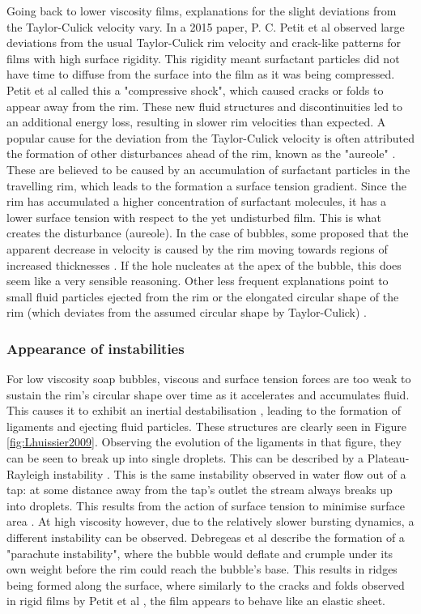 \documentclass[a4paper,12pt]{article}
\numberwithin{equation}{section}
\numberwithin{figure}{section}
\numberwithin{table}{section}
\begin{document}
Going back to lower viscosity films, explanations for the slight deviations from the Taylor-Culick velocity vary. In a 2015 paper, P. C. Petit et al \cite{Petit2015} observed large deviations from the usual Taylor-Culick rim velocity and crack-like patterns for films with high surface rigidity. This rigidity meant surfactant particles did not have time to diffuse from the surface into the film as it was being compressed. Petit et al called this a "compressive shock", which caused cracks or folds to appear away from the rim. These new fluid structures and discontinuities led to an additional energy loss, resulting in slower rim velocities than expected. A popular cause for the deviation from the Taylor-Culick velocity is often attributed the formation of other disturbances ahead of the rim, known as the "aureole" \cite{McEntee1969, Bico2015, Muller2009}. These are believed to be caused by an accumulation of surfactant particles in the travelling rim, which leads to the formation a surface tension gradient. Since the rim has accumulated a higher concentration of surfactant molecules, it has a lower surface tension with respect to the yet undisturbed film. This is what creates the disturbance (aureole). In the case of bubbles, some proposed that the apparent decrease in velocity is caused by the rim moving towards regions of increased thicknesses \cite{Mukerjee1971, Debregeas1998}. If the hole nucleates at the apex of the bubble, this does seem like a very sensible reasoning. Other less frequent explanations point to small fluid particles ejected from the rim \cite{Muller2009} or the elongated circular shape of the rim (which deviates from the assumed circular shape by Taylor-Culick) \cite{Bico2015}.

\subsubsection{Appearance of instabilities}
For low viscosity soap bubbles, viscous and surface tension forces are too weak to sustain the rim's circular shape over time as it accelerates and accumulates fluid. This causes it to exhibit an inertial destabilisation \cite{Lhuissier2011}, leading to the formation of ligaments and ejecting fluid particles. These structures are clearly seen in Figure \ref{fig:Lhuissier2009}. Observing the evolution of the ligaments in that figure, they can be seen to break up into single droplets. This can be described by a Plateau-Rayleigh instability \cite{Lhuissier2011}. This is the same instability observed in water flow out of a tap: at some distance away from the tap's outlet the stream always breaks up into droplets. This results from the action of surface tension to minimise surface area \cite{Rayleigh1878}. At high viscosity however, due to the relatively slower bursting dynamics, a different instability can be observed. Debregeas et al \cite{Debregeas1998} describe the formation of a "parachute instability", where the bubble would deflate and crumple under its own weight before the rim could reach the bubble's base. This results in ridges being formed along the surface, where similarly to the cracks and folds observed in rigid films by Petit et al \cite{Petit2015}, the film appears to behave like an elastic sheet.
\end{document}
